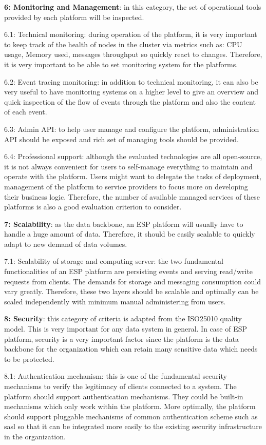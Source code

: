 \textbf{6: Monitoring and Management}: in this category, the set of operational tools provided by each platform will be inspected. 

6.1: Technical monitoring: during operation of the platform, it is very important to keep track of the health of nodes in the cluster via metrics such as: CPU usage, Memory used, messages throughput so quickly react to changes. Therefore, it is very important to be able to set monitoring system for the platforms.

6.2: Event tracing monitoring: in addition to technical monitoring, it can also be very useful to have monitoring systems on a higher level to give an overview and quick inspection of the flow of events through the platform and also the content of each event.

6.3: Admin API: to help user manage and configure the platform, administration API should be exposed and rich set of managing tools should be provided. 

6.4: Professional support: although the evaluated technologies are all open-source, it is not always convenient for users to self-manage everything to maintain and operate with the platform. Users might want to delegate the tasks of deployment, management of the platform to service providers to focus more on developing their business logic. Therefore, the number of available managed services of these platforms is also a good evaluation criterion to consider.


\textbf{7: Scalability}: as the data backbone, an ESP platform will usually have to handle a huge amount of data. Therefore, it should be easily scalable to quickly adapt to new demand of data volumes.

7.1: Scalability of storage and computing server: the two fundamental functionalities of an ESP platform are persisting events and serving read/write requests from clients. The demands for storage and messaging consumption could vary greatly. Therefore, these two layers should be scalable and optimally can be scaled independently with minimum manual administering from users.

\textbf{8: Security}: this category of criteria is adapted from the ISO25010 quality model. This is very important for any data system in general. In case of ESP platform, security is a very important factor since the platform is the data backbone for the organization which can retain many sensitive data which needs to be protected.

8.1: Authentication mechanism: this is one of the fundamental security mechanisms to verify the legitimacy of clients connected to a system. The platform should support authentication mechanisms. They could be built-in mechanisms which only work within the platform. More optimally, the platform should support pluggable mechanisms of common authentication scheme such as \acrfull{sasl} so that it can be integrated more easily to the existing security infrastructure in the organization.


